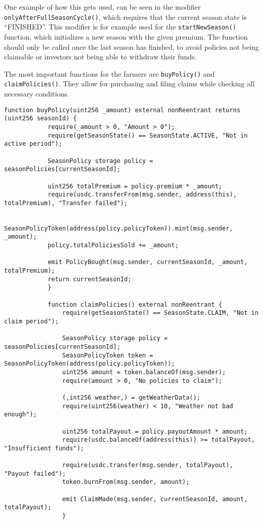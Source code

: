 \documentclass[11pt,a4paper]{article}
\begin{document}
		One example of how this gets used, can be seen in the modifier \texttt{onlyAfterFullSeasonCycle()}, which requires that the current season state is \enquote{FINISHED}.
		This modifier is for example used for the \texttt{startNewSeason()} function, which initializes a new season with the given premium.
		The function should only be called once the last season has finished, to avoid policies not being claimable or investors not being able to withdraw their funds.

        \bigskip

		The most important functions for the farmers are \texttt{buyPolicy()} and \texttt{claimPolicies()}.
		They allow for purchasing and filing claims while checking all necessary conditions.

		\begin{lstlisting}[style=soliditystyle, caption={Excerpt: RainyDayFund.sol - Farmer Functions},label={lst:contract-claims}]
		function buyPolicy(uint256 _amount) external nonReentrant returns (uint256 seasonId) {
			require(_amount > 0, "Amount > 0");
			require(getSeasonState() == SeasonState.ACTIVE, "Not in active period");

			SeasonPolicy storage policy = seasonPolicies[currentSeasonId];

			uint256 totalPremium = policy.premium * _amount;
			require(usdc.transferFrom(msg.sender, address(this), totalPremium), "Transfer failed");

			SeasonPolicyToken(address(policy.policyToken)).mint(msg.sender, _amount);
			policy.totalPoliciesSold += _amount;

			emit PolicyBought(msg.sender, currentSeasonId, _amount, totalPremium);
			return currentSeasonId;
			}

			function claimPolicies() external nonReentrant {
				require(getSeasonState() == SeasonState.CLAIM, "Not in claim period");

				SeasonPolicy storage policy = seasonPolicies[currentSeasonId];
				SeasonPolicyToken token = SeasonPolicyToken(address(policy.policyToken));
				uint256 amount = token.balanceOf(msg.sender);
				require(amount > 0, "No policies to claim");

				(,int256 weather,) = getWeatherData();
				require(uint256(weather) < 10, "Weather not bad enough");

				uint256 totalPayout = policy.payoutAmount * amount;
				require(usdc.balanceOf(address(this)) >= totalPayout, "Insufficient funds");

				require(usdc.transfer(msg.sender, totalPayout), "Payout failed");
				token.burnFrom(msg.sender, amount);

				emit ClaimMade(msg.sender, currentSeasonId, amount, totalPayout);
				}
		\end{lstlisting}
\end{document}
